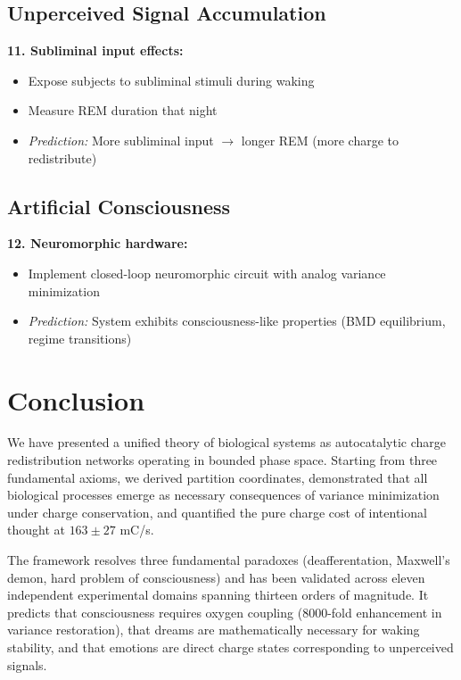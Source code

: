 \documentclass[12pt,a4paper]{article}
\begin{document}
\subsection{Unperceived Signal Accumulation}

\textbf{11. Subliminal input effects:}
\begin{itemize}
\item Expose subjects to subliminal stimuli during waking
\item Measure REM duration that night
\item \textit{Prediction:} More subliminal input $\to$ longer REM (more charge to redistribute)
\end{itemize}

\subsection{Artificial Consciousness}

\textbf{12. Neuromorphic hardware:}
\begin{itemize}
\item Implement closed-loop neuromorphic circuit with analog variance minimization
\item \textit{Prediction:} System exhibits consciousness-like properties (BMD equilibrium, regime transitions)
\end{itemize}

\section{Conclusion}

We have presented a unified theory of biological systems as autocatalytic charge redistribution networks operating in bounded phase space. Starting from three fundamental axioms, we derived partition coordinates, demonstrated that all biological processes emerge as necessary consequences of variance minimization under charge conservation, and quantified the pure charge cost of intentional thought at $163 \pm 27$ mC/s.

The framework resolves three fundamental paradoxes (deafferentation, Maxwell's demon, hard problem of consciousness) and has been validated across eleven independent experimental domains spanning thirteen orders of magnitude. It predicts that consciousness requires oxygen coupling (8000-fold enhancement in variance restoration), that dreams are mathematically necessary for waking stability, and that emotions are direct charge states corresponding to unperceived signals.
\end{document}
